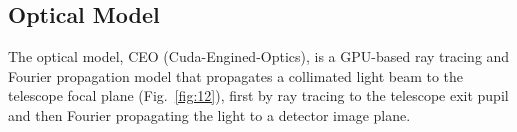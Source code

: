 \documentclass[]{AO4ELT}  %
\begin{document}





\clearpage

\subsection{Optical Model}
\label{sec:optics}

The optical model, CEO (Cuda-Engined-Optics), is a GPU-based ray tracing and Fourier propagation model that propagates a collimated light beam to the telescope focal plane (Fig.~\ref{fig:12}),
first by ray tracing to the telescope exit pupil and then Fourier propagating the light to a detector image plane.
\end{document}
